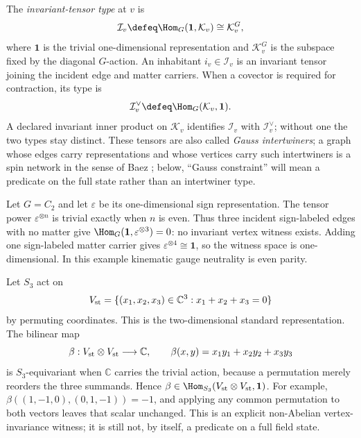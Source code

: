 \begin{definition}
The \emph{invariant-tensor type} at $v$ is
\begin{equation}
\mathcal I_v\defeq\Hom_G(\mathbf 1,\mathcal K_v)
 \cong \mathcal K_v^G,
 \label{eq:gauss-intertwiner}
\end{equation}
where $\mathbf 1$ is the trivial one-dimensional representation and
$\mathcal K_v^G$ is the subspace fixed by the diagonal $G$-action.
An inhabitant $i_v\in\mathcal I_v$ is an invariant tensor joining the incident
edge and matter carriers.  When a covector is required for contraction, its
type is
\[
 \mathcal I_v^{\vee}\defeq\Hom_G(\mathcal K_v,\mathbf1).
\]
A declared invariant inner product on $\mathcal K_v$ identifies
$\mathcal I_v$ with $\mathcal I_v^{\vee}$; without one the two types stay
distinct.  These tensors are also called
\emph{Gauss intertwiners}; a graph whose edges carry representations and
whose vertices carry such intertwiners is a spin network in the sense of
Baez \cite{BaezSpinNetworks}; below, ``Gauss constraint'' will mean a predicate on
the full state rather than an intertwiner type.
\end{definition}

\begin{example}
\label{ex:c2-vertex-parity}
Let $G=C_2$ and let $\varepsilon$ be its one-dimensional sign
representation.  The tensor power $\varepsilon^{\otimes n}$ is trivial
exactly when $n$ is even.  Thus three incident sign-labeled edges with no
matter give
$\Hom_G(\mathbf1,\varepsilon^{\otimes3})=0$: no invariant vertex witness
exists.  Adding
one sign-labeled matter carrier gives
$\varepsilon^{\otimes4}\cong\mathbf1$, so the witness space is
one-dimensional.  In this example kinematic gauge neutrality is even
parity.
\end{example}

\begin{example}
Let $S_3$ act on
\[
 V_{\rm st}=\{(x_1,x_2,x_3)\in\mathbb C^3:x_1+x_2+x_3=0\}
\]
by permuting coordinates.  This is the two-dimensional standard
representation.  The bilinear map
\[
 \beta:V_{\rm st}\otimes V_{\rm st}\longrightarrow\mathbb C,
 \qquad
 \beta(x,y)=x_1y_1+x_2y_2+x_3y_3
\]
is $S_3$-equivariant when $\mathbb C$ carries the trivial action, because a
permutation merely reorders the three summands.  Hence
$\beta\in\Hom_{S_3}(V_{\rm st}\otimes V_{\rm st},\mathbf1)$.  For example,
$\beta((1,-1,0),(0,1,-1))=-1$, and applying any common permutation to both
vectors leaves that scalar unchanged.  This is an explicit non-Abelian
vertex-invariance witness; it is still not, by itself, a predicate on a full
field state.
\end{example}

